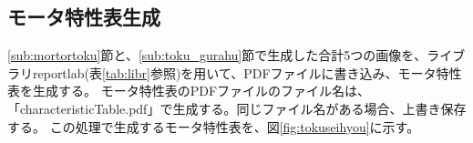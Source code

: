 \subsection{モータ特性表生成}\label{sub:}
\ref{sub:mortortoku}節と、\ref{sub:toku_gurahu}節で生成した合計5つの画像を、ライブラリreportlab(表\ref{tab:libr}参照)を用いて、PDFファイルに書き込み、モータ特性表を生成する。
モータ特性表のPDFファイルのファイル名は、「characteristicTable.pdf」で生成する。同じファイル名がある場合、上書き保存する。
この処理で生成するモータ特性表を、図\ref{fig:tokuseihyou}に示す。
